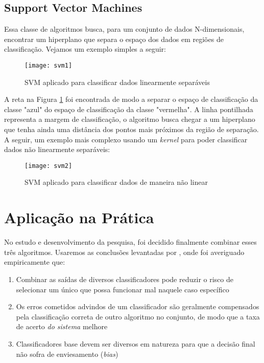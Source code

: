\subsection{Support Vector Machines}

Essa classe de algoritmos busca, para um conjunto de dados N-dimensionais, encontrar um hiperplano que separa o espaço dos dados em regiões de classificação. Vejamos um exemplo simples a seguir:


\begin{figure}[H]
	\centering
	\caption{SVM aplicado para classificar dados linearmente separáveis}
  \texttt{[image: svm1]}
\label{fig:svm1}  

\end{figure}



A reta na Figura \ref{fig:svm1} foi encontrada de modo a separar o espaço de classificação da classe "azul" do espaço de classificação da classe "vermelha". A linha pontilhada representa a margem de classificação, o algoritmo busca chegar a um hiperplano que tenha ainda uma distância dos pontos mais próximos da região de separação. A seguir, um exemplo mais complexo usando um \textit{kernel}  para poder classificar dados não linearmente separáveis:

\begin{figure}[H]
	\centering
	\caption{SVM aplicado para classificar dados de maneira não linear}
  \texttt{[image: svm2]}
\label{fig:svm2}  

\end{figure}

\section{Aplicação na Prática}

No estudo e desenvolvimento da pesquisa, foi decidido finalmente combinar esses três algoritmos. Usaremos as conclusões levantadas por \cite{comparativeEN}, onde foi averiguado empiricamente que: 

\begin{enumerate}
\item Combinar as saídas de diversos classificadores pode reduzir o risco de selecionar um único que possa funcionar mal naquele caso específico
\item Os erros cometidos advindos de um classificador são geralmente compensados pela classificação correta de outro algoritmo no conjunto, de modo que a taxa de acerto \textit{do sistema} melhore
\item Classificadores base devem ser diversos em natureza para que a decisão final não sofra de enviesamento (\textit{bias})
\end{enumerate}



